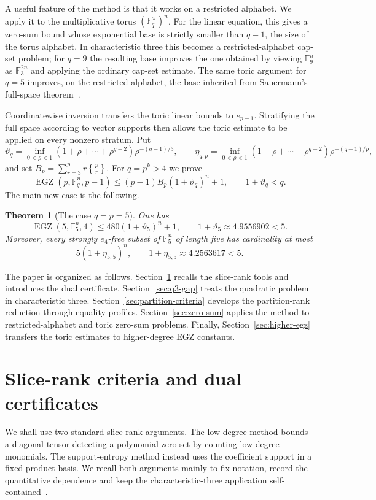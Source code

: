 \documentclass[10pt,a4paper]{amsart}
\newtheorem{theorem}{Theorem}[section]
\theoremstyle{definition}
\newcommand{\F}{\mathbb F}
\newcommand{\EGZ}{\operatorname{EGZ}}
\newcommand{\1}{\mathbf 1}
\newcommand{\StirlingTwo}[2]{\genfrac\{\}{0pt}{}{#1}{#2}}
\begin{document}
A useful feature of the method is that it works on a restricted alphabet.  We apply it to the multiplicative torus $(\F_q^\times)^n$.  For the linear equation, this gives a zero-sum bound whose exponential base is strictly smaller than $q-1$, the size of the torus alphabet.  In characteristic three this becomes a restricted-alphabet cap-set problem; for $q=9$ the resulting base improves the one obtained by viewing $\F_9^n$ as $\F_3^{2n}$ and applying the ordinary cap-set estimate.  The same toric argument for $q=5$ improves, on the restricted alphabet, the base inherited from Sauermann's full-space theorem~\cite{SauermannDistinct}.

Coordinatewise inversion transfers the toric linear bounds to $e_{p-1}$.  Stratifying the full space according to vector supports then allows the toric estimate to be applied on every nonzero stratum.  Put
$$
 \vartheta_q=\inf_{0<\rho<1}(1+\rho+\cdots+\rho^{q-2})\rho^{-(q-1)/3},
 \qquad
 \eta_{q,p}=\inf_{0<\rho<1}(1+\rho+\cdots+\rho^{q-2})\rho^{-(q-1)/p},
$$
and set $
 B_p=\sum_{r=3}^p r\StirlingTwo{p}{r}.
$
For $q=p^k>4$ we prove
\[
 \EGZ(p,\F_q^n,p-1)\le(p-1)B_p(1+\vartheta_q)^n+1,
 \qquad1+\vartheta_q<q.
\]
The main new case is the following.
\begin{theorem}[The case $q=p=5$]\label{thm:intro-q5}
One has
\[
 \EGZ(5,\F_5^n,4)\le480(1+\vartheta_5)^n+1,
 \qquad1+\vartheta_5\approx4.9556902<5.
\]
Moreover, every strongly $e_4$-free subset of $\F_5^n$ of length five has cardinality at most
\[
 5(1+\eta_{5,5})^n,
 \qquad1+\eta_{5,5}\approx4.2563617<5.
\]
\end{theorem}

The paper is organized as follows.  Section~\ref{sec:slice-criteria} recalls the slice-rank tools and introduces the dual certificate.  Section~\ref{sec:q3-gap} treats the quadratic problem in characteristic three.  Section~\ref{sec:partition-criteria} develops the partition-rank reduction through equality profiles.  Section~\ref{sec:zero-sum} applies the method to restricted-alphabet and toric zero-sum problems.  Finally, Section~\ref{sec:higher-egz} transfers the toric estimates to higher-degree EGZ constants.

\section{Slice-rank criteria and dual certificates}\label{sec:slice-criteria}

We shall use two standard slice-rank arguments.  The low-degree method bounds a diagonal tensor detecting a polynomial zero set by counting low-degree monomials.  The support-entropy method instead uses the coefficient support in a fixed product basis.  {We recall both arguments mainly to fix notation, record the quantitative dependence and keep the characteristic-three application self-contained~\cite{CrootLevPach,EllenbergGijswijt,TaoBlog,TaoSawin}.}
\end{document}
